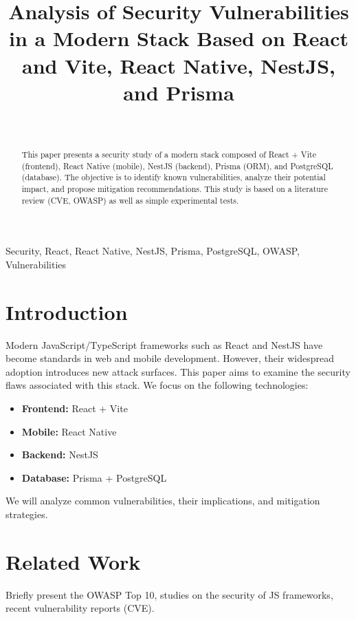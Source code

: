 \documentclass[conference]{IEEEtran}
\title{Analysis of Security Vulnerabilities in a Modern Stack Based on React and Vite, React Native, NestJS, and Prisma}
\author{
    \IEEEauthorblockN{STROUN Elie}
    \IEEEauthorblockA{Epitech Rennes\\
    elie.stroun@epitech.eu}

    \newline
    \\
    \IEEEauthorblockA{Contributors: Nathan Jeannot, Manech Dubreil, Aymeric Jouannet-Mimy, Pablo Jesus}
}
\begin{document}
\maketitle

\begin{abstract}
This paper presents a security study of a modern stack composed of React + Vite (frontend), React Native (mobile), NestJS (backend), Prisma (ORM), and PostgreSQL (database). The objective is to identify known vulnerabilities, analyze their potential impact, and propose mitigation recommendations. This study is based on a literature review (CVE, OWASP) as well as simple experimental tests.
\end{abstract}

\begin{IEEEkeywords}
Security, React, React Native, NestJS, Prisma, PostgreSQL, OWASP, Vulnerabilities
\end{IEEEkeywords}

\section{Introduction}
Modern JavaScript/TypeScript frameworks such as React and NestJS have become standards in web and mobile development. However, their widespread adoption introduces new attack surfaces. This paper aims to examine the security flaws associated with this stack. We focus on the following technologies:
\begin{itemize}
    \item \textbf{Frontend:} React + Vite
    \item \textbf{Mobile:} React Native
    \item \textbf{Backend:} NestJS
    \item \textbf{Database:} Prisma + PostgreSQL
\end{itemize}
We will analyze common vulnerabilities, their implications, and mitigation strategies.

\section{Related Work}
Briefly present the OWASP Top 10, studies on the security of JS frameworks, recent vulnerability reports (CVE).
\end{document}
